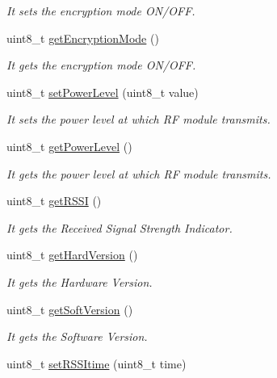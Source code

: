 \begin{DoxyCompactItemize}
\begin{DoxyCompactList}\small\item\em It sets the encryption mode O\+N/\+O\+FF. \end{DoxyCompactList}\item 
uint8\+\_\+t \hyperlink{class_wasp_x_bee_core_acf7718072cbd236b4ba613bb5ee09c40}{get\+Encryption\+Mode} ()
\begin{DoxyCompactList}\small\item\em It gets the encryption mode O\+N/\+O\+FF. \end{DoxyCompactList}\item 
uint8\+\_\+t \hyperlink{class_wasp_x_bee_core_ad27ff79accc7d5261163d02e2387fa05}{set\+Power\+Level} (uint8\+\_\+t value)
\begin{DoxyCompactList}\small\item\em It sets the power level at which RF module transmits. \end{DoxyCompactList}\item 
uint8\+\_\+t \hyperlink{class_wasp_x_bee_core_a6db227aa4aa0d0ee2a42539fd927161f}{get\+Power\+Level} ()
\begin{DoxyCompactList}\small\item\em It gets the power level at which RF module transmits. \end{DoxyCompactList}\item 
uint8\+\_\+t \hyperlink{class_wasp_x_bee_core_ad45db3b4fbdf82dabe22fcf525f24e84}{get\+R\+S\+SI} ()
\begin{DoxyCompactList}\small\item\em It gets the Received Signal Strength Indicator. \end{DoxyCompactList}\item 
uint8\+\_\+t \hyperlink{class_wasp_x_bee_core_a205b4d9ea047024cf27b26a8b169c5ec}{get\+Hard\+Version} ()
\begin{DoxyCompactList}\small\item\em It gets the Hardware Version. \end{DoxyCompactList}\item 
uint8\+\_\+t \hyperlink{class_wasp_x_bee_core_a7e00fb1e12afa3749fcdbe294affafcb}{get\+Soft\+Version} ()
\begin{DoxyCompactList}\small\item\em It gets the Software Version. \end{DoxyCompactList}\item 
uint8\+\_\+t \hyperlink{class_wasp_x_bee_core_a69431eafd00d4be7d52a4319481ea7a2}{set\+R\+S\+S\+Itime} (uint8\+\_\+t time)

\end{DoxyCompactItemize}
